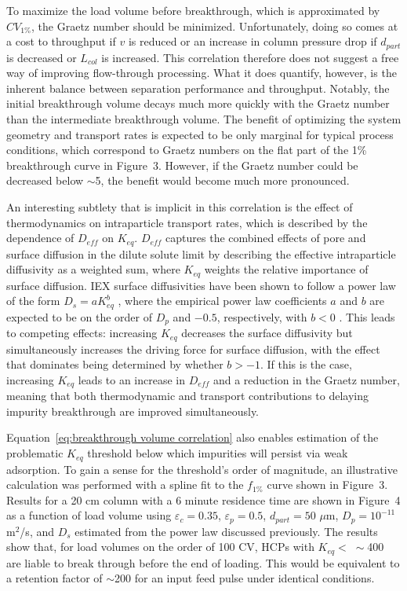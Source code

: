 \documentclass[preprint,review,12pt]{elsarticle}
\begin{document}
        To maximize the load volume before breakthrough, which is approximated by $CV_{1\%}$, the Graetz number should be minimized. Unfortunately, doing so comes at a cost to throughput if $v$ is reduced or an increase in column pressure drop if $d_{part}$ is decreased or $L_{col}$ is increased. This correlation therefore does not suggest a free way of improving flow-through processing. What it does quantify, however, is the inherent balance between separation performance and throughput. Notably, the initial breakthrough volume decays much more quickly with the Graetz number than the intermediate breakthrough volume. The benefit of optimizing the system geometry and transport rates is expected to be only marginal for typical process conditions, which correspond to Graetz numbers on the flat part of the 1\% breakthrough curve in Figure~3. However, if the Graetz number could be decreased below $\sim$5, the benefit would become much more pronounced.

        An interesting subtlety that is implicit in this correlation is the effect of thermodynamics on intraparticle transport rates, which is described by the dependence of $D_{eff}$ on $K_{eq}$. $D_{eff}$ captures the combined effects of pore and surface diffusion in the dilute solute limit by describing the effective intraparticle diffusivity as a weighted sum, where $K_{eq}$ weights the relative importance of surface diffusion. IEX surface diffusivities have been shown to follow a power law of the form $D_s = a K_{eq}^b$ \cite{Khanal7004}, where the empirical power law coefficients $a$ and $b$ are expected to be on the order of $D_p$ and $-0.5$, respectively, with $b < 0$ \cite{Wesselingh2001, Lenhoff2008}. This leads to competing effects: increasing $K_{eq}$ decreases the surface diffusivity but simultaneously increases the driving force for surface diffusion, with the effect that dominates being determined by whether $b > -1$. If this is the case, increasing $K_{eq}$ leads to an increase in $D_{eff}$ and a reduction in the Graetz number, meaning that both thermodynamic and transport contributions to delaying impurity breakthrough are improved simultaneously.

        Equation~\ref{eq:breakthrough volume correlation} also enables estimation of the problematic $K_{eq}$ threshold below which impurities will persist via weak adsorption. To gain a sense for the threshold's order of magnitude, an illustrative calculation was performed with a spline fit to the $f_{1\%}$ curve shown in Figure~3. Results for a 20 cm column with a 6 minute residence time are shown in Figure~4 as a function of load volume using $\varepsilon_c = 0.35$, $\varepsilon_p = 0.5$, $d_{part} = 50$ $\mu$m, $D_p = 10^{-11}$ m$^2$/s, and $D_s$ estimated from the power law discussed previously. The results show that, for load volumes on the order of 100 CV, HCPs with $K_{eq} < \; \sim$400 are liable to break through before the end of loading. This would be equivalent to a retention factor of $\sim$200 for an input feed pulse under identical conditions.
\end{document}
